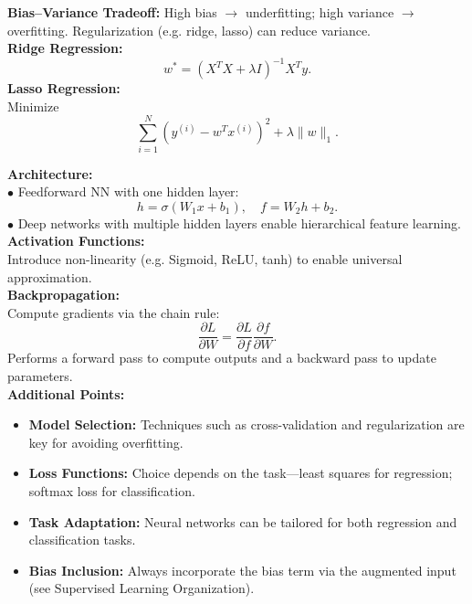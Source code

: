 \documentclass[10pt,landscape]{article}
\begin{document}
\begin{multicols}{3}

\begin{tcolorbox}[breakable, title=Bias--Variance \& Regularization]
\textbf{Bias--Variance Tradeoff:} High bias \(\rightarrow\) underfitting; high variance \(\rightarrow\) overfitting. Regularization (e.g. ridge, lasso) can reduce variance.\\[2mm]
\textbf{Ridge Regression:}\\
\[
w^*=(X^TX+\lambda I)^{-1}X^Ty.
\]
\textbf{Lasso Regression:}\\
Minimize
\[
\sum_{i=1}^N \left(y^{(i)}-w^T x^{(i)}\right)^2+\lambda\|w\|_1.
\]
\end{tcolorbox}

\begin{tcolorbox}[breakable, title=Neural Networks]
\textbf{Architecture:}\\
\(\bullet\) Feedforward NN with one hidden layer: 
\[
h = \sigma(W_1 x + b_1),\quad f = W_2 h + b_2.
\]
\(\bullet\) Deep networks with multiple hidden layers enable hierarchical feature learning.\\[1mm]
\textbf{Activation Functions:}\\
Introduce non-linearity (e.g. Sigmoid, ReLU, tanh) to enable universal approximation.\\[1mm]
\textbf{Backpropagation:}\\
Compute gradients via the chain rule:
\[
\frac{\partial L}{\partial W} = \frac{\partial L}{\partial f}\frac{\partial f}{\partial W}.
\]
Performs a forward pass to compute outputs and a backward pass to update parameters.\\[1mm]
\textbf{Additional Points:}
\begin{itemize}[noitemsep, topsep=0pt]
    \item \textbf{Model Selection:} Techniques such as cross-validation and regularization are key for avoiding overfitting.
    \item \textbf{Loss Functions:} Choice depends on the task—least squares for regression; softmax loss for classification.
    \item \textbf{Task Adaptation:} Neural networks can be tailored for both regression and classification tasks.
    \item \textbf{Bias Inclusion:} Always incorporate the bias term via the augmented input (see Supervised Learning Organization).
\end{itemize}
\end{tcolorbox}


\end{multicols}
\end{document}
